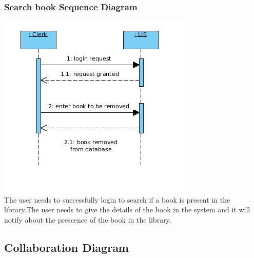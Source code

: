 \documentclass[a4paper]{article}
\begin{document}
\subsubsection*{Search book Sequence Diagram}
\includegraphics[scale=0.50]{images/seqDiagBookRemoval.png}
\\
The user needs to successfully login to search if a book is present in the library.The user needs to give the details of the book in the system and it will notify about the prescence of the book in the library.
\\

\subsection{Collaboration Diagram}
\end{document}
